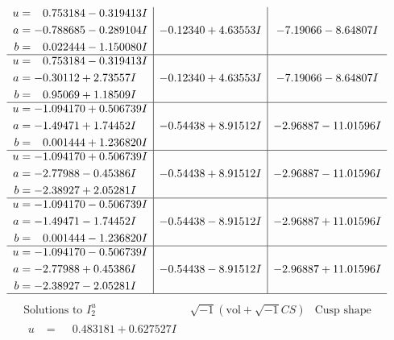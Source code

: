 \documentclass[1p]{elsarticle_modified}
\theoremstyle{definition}
\newcommand{\I}{\sqrt{-1}}
\begin{document}
$$\begin{array}{c|c|c}
\begin{aligned}
u &= \phantom{-}0.753184 - 0.319413 I \\
a &= -0.788685 - 0.289104 I \\
b &= \phantom{-}0.022444 - 1.150080 I\end{aligned}
 & -0.12340 + 4.63553 I & -7.19066 - 8.64807 I \\ \hline\begin{aligned}
u &= \phantom{-}0.753184 - 0.319413 I \\
a &= -0.30112 + 2.73557 I \\
b &= \phantom{-}0.95069 + 1.18509 I\end{aligned}
 & -0.12340 + 4.63553 I & -7.19066 - 8.64807 I \\ \hline\begin{aligned}
u &= -1.094170 + 0.506739 I \\
a &= -1.49471 + 1.74452 I \\
b &= \phantom{-}0.001444 + 1.236820 I\end{aligned}
 & -0.54438 + 8.91512 I & -2.96887 - 11.01596 I \\ \hline\begin{aligned}
u &= -1.094170 + 0.506739 I \\
a &= -2.77988 - 0.45386 I \\
b &= -2.38927 + 2.05281 I\end{aligned}
 & -0.54438 + 8.91512 I & -2.96887 - 11.01596 I \\ \hline\begin{aligned}
u &= -1.094170 - 0.506739 I \\
a &= -1.49471 - 1.74452 I \\
b &= \phantom{-}0.001444 - 1.236820 I\end{aligned}
 & -0.54438 - 8.91512 I & -2.96887 + 11.01596 I \\ \hline\begin{aligned}
u &= -1.094170 - 0.506739 I \\
a &= -2.77988 + 0.45386 I \\
b &= -2.38927 - 2.05281 I\end{aligned}
 & -0.54438 - 8.91512 I & -2.96887 + 11.01596 I\\
 \hline 
 \end{array}$$\newpage$$\begin{array}{c|c|c}  
\text{Solutions to }I^u_{2}& \I (\text{vol} + \sqrt{-1}CS) & \text{Cusp shape}\\
 \hline 
\begin{aligned}
u &= \phantom{-}0.483181 + 0.627527 I \\

\end{aligned}
\end{array}$$
\end{document}
